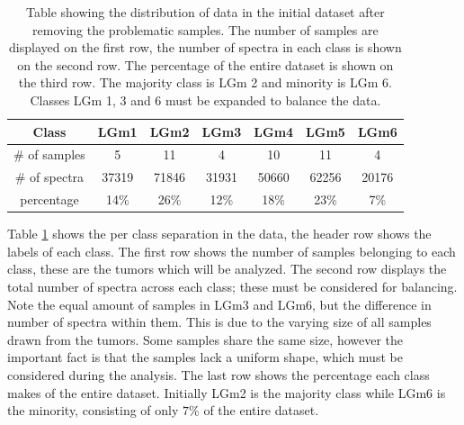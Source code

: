\begin{table}[h!]
\centering
 \begin{tabular}{||c c c c c c c||} 
 \hline
 Class & LGm1 & LGm2 & LGm3 & LGm4 & LGm5 & LGm6 \\ [0.5ex] 
 \hline\hline
 \# of samples & 5& 11 & 4 & 10 & 11 & 4 \\ 
 \hline
 \# of spectra & 37319 & 71846 & 31931 & 50660 & 62256 & 20176 \\
 \hline
 percentage & 14\%& 26\% & 12\% & 18\% & 23\% & 7\% \\
 \hline

\end{tabular}
\caption{Table showing the distribution of data in the initial dataset after removing the problematic samples. The number of samples are displayed on the first row, the number of spectra in each class is shown on the second row. The percentage of the entire dataset is shown on the third row. The majority class is LGm 2 and minority is LGm 6.  Classes LGm 1, 3 and 6 must be expanded to balance the data.}
\label{table:1}
\end{table}

Table \ref{table:1} shows the per class separation in the data, the header row shows the labels of each class. The first row shows the number of samples belonging to each class, these are the tumors which will be analyzed. The second row displays the total number of spectra across each class; these must be considered for balancing. Note the equal amount of samples in LGm3 and LGm6, but the difference in number of spectra within them. This is due to the varying size of all samples drawn from the tumors. Some samples share the same size, however the important fact is that the samples lack a uniform shape, which must be considered during the analysis. The last row shows the percentage each class makes of the entire dataset. Initially LGm2 is the majority class while LGm6 is the minority, consisting of only $7$\% of the entire dataset.

